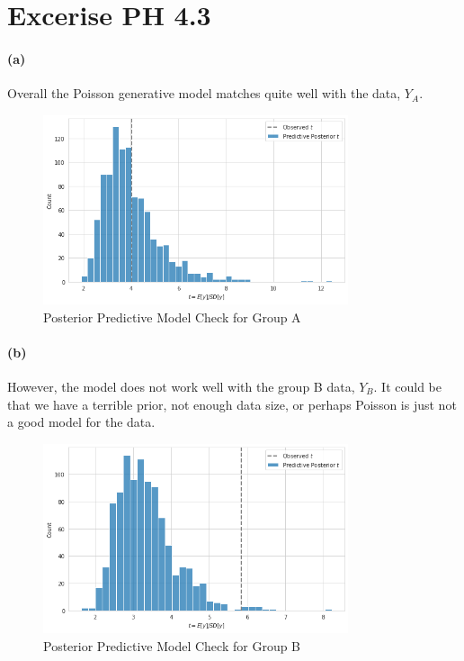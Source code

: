 \documentclass[11pt, letterpaper]{article}
\begin{document}
\newpage


\section{Excerise PH 4.3}
\paragraph{(a)}
Overall the Poisson generative model matches quite well with the data, $Y_A$. 

\begin{figure}[!h]
  \centering
  \includegraphics[width=0.8\textwidth]{4.3.a.png}
  \captionsetup{justification=centering}
  \caption{Posterior Predictive Model Check for Group A}
\end{figure}

\paragraph{(b)}
However, the model does not work well with the group B data, $Y_B$. It could be that we have a terrible prior,
not enough data size, or perhaps Poisson is just not a good model for the data.

\begin{figure}[!h]
  \centering
  \includegraphics[width=0.8\textwidth]{4.3.b.png}
  \captionsetup{justification=centering}
  \caption{Posterior Predictive Model Check for Group B}
\end{figure}
\newpage
\end{document}
